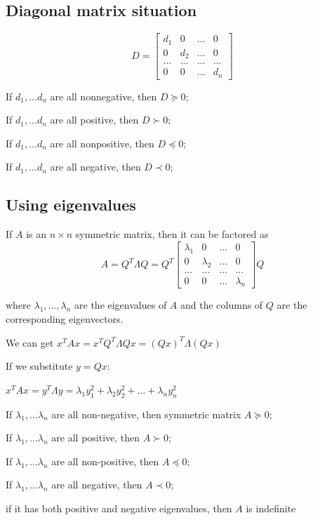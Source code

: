 \documentclass[11pt]{elegantbook}
\begin{document}
\subsection{Diagonal matrix situation}
$$D=\begin{bmatrix}
    d_1&0&... &0\\0&d_2&...&0\\...&...&...&...\\0&0&...&d_n
\end{bmatrix}$$
\begin{lemma}
    If $d_1,...d_n$ are all nonnegative, then $D\succeq 0$;

    If $d_1,...d_n$ are all positive, then $D\succ 0$;
    
    If $d_1,...d_n$ are all nonpositive, then $D\preceq 0$;
    
    If $d_1,...d_n$ are all negative, then $D\prec 0$;
\end{lemma}

\subsection{Using eigenvalues}
If $A$ is an $n \times n$ symmetric matrix, then it can be factored as
    $$A=Q^T\Lambda Q=Q^T
    \begin{bmatrix}
        \lambda_1&0&... &0\\
        0&\lambda_2&...&0\\
       ...&...&...&...\\
        0&0&...&\lambda_n
    \end{bmatrix}Q$$

where $\lambda_1,..., \lambda_n$ are the eigenvalues of $A$ and the columns of $Q$ are the corresponding eigenvectors.

    We can get $x^TAx=x^TQ^T\Lambda Qx=(Qx)^T\Lambda(Qx)$
    
    If we substitute $y=Qx$:
    
    $x^TAx=y^T\Lambda y=\lambda_1y_1^2+\lambda_2y_2^2+...+\lambda_ny_n^2$

\begin{theorem}
    \quad

    If $\lambda_1,...\lambda_n$ are all non-negative, then symmetric matrix $A\succeq 0$;
    
    If $\lambda_1,...\lambda_n$ are all positive, then $A\succ 0$;
    
    If $\lambda_1,...\lambda_n$ are all non-positive, then $A\preceq 0$;
    
    If $\lambda_1,...\lambda_n$ are all negative, then $A\prec 0$;
    
    if it has both positive and negative eigenvalues, then $A$ is indefinite
\end{theorem}
\end{document}
